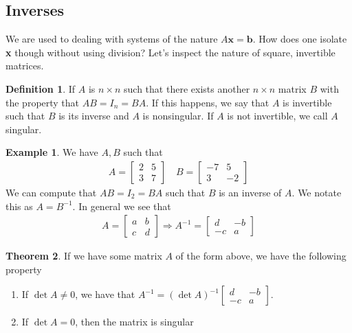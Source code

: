 \documentclass{article}
\numberwithin{equation}{section}
\theoremstyle{definition}
\newtheorem{thm}{Theorem}[subsection]
\newtheorem{defn}{Definition}[subsection]
\newtheorem{ex}[thm]{Example}
\newcommand{\x}{\times}
\theoremstyle{adefn}
\begin{document}
	\subsection{Inverses}
	We are used to dealing with systems of the nature $A\mathbf{x} = \mathbf{b}$. How does one isolate \textbf{x} though without using division? Let's inspect the nature of square, invertible matrices.
	\begin{defn}
		If $A$ is $n \x n$ such that there exists another $n \x n$ matrix $B$ with the property that $AB = I_n = BA$. If this happens, we say that $A$ is invertible such that $B$ is its inverse and $A$ is nonsingular. If $A$ is not invertible, we call $A$ singular. 
	\end{defn}
	\begin{ex} We have $A, B$ such that
		\begin{align*}
			A = \begin{bmatrix}
				2 & 5 \\ 3 & 7
			\end{bmatrix} \quad B = \begin{bmatrix}
			-7 & 5 \\ 3 & -2
			\end{bmatrix}
		\end{align*}
		We can compute that $AB = I_2 = BA$ such that $B$ is an inverse of $A$. We notate this as $A = B^{-1}$. In general we see that 
		\begin{align*}
			A = \begin{bmatrix}
				a & b \\ c & d
			\end{bmatrix} \Rightarrow A^{-1} = \begin{bmatrix}
			d & -b \\ -c & a
			\end{bmatrix}
		\end{align*}
	\end{ex}
	\begin{thm}
		If we have some matrix $A$ of the form above, we have the following property
		\begin{enumerate}
			\item If $\det A \neq 0$, we have that $A^{-1} = (\det A)^{-1} \begin{bmatrix}
			d & -b \\ -c & a
			\end{bmatrix}$.
			\item If $\det A = 0$, then the matrix is singular
		\end{enumerate}
	\end{thm}
\end{document}
